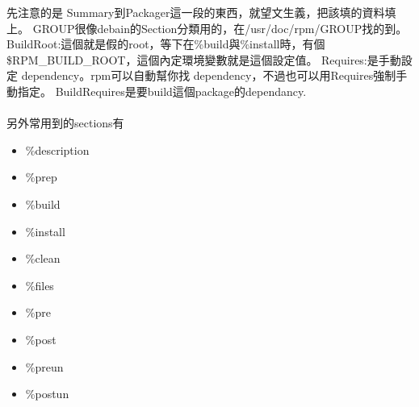 先注意的是 Summary到Packager這一段的東西，就望文生義，把該填的資料填上。
GROUP很像debain的Section分類用的，在/usr/doc/rpm/GROUP找的到。
BuildRoot:這個就是假的root，等下在\%build與\%install時，有個
\$RPM\_BUILD\_ROOT，這個內定環境變數就是這個設定值。 Requires:是手動設定
dependency。rpm可以自動幫你找 dependency，不過也可以用Requires強制手動指定。
BuildRequires是要build這個package的dependancy.
\\\\
另外常用到的sections有
\begin{itemize}
  \item \%description
  \item \%prep
  \item \%build
  \item \%install
  \item \%clean
  \item \%files
  \item \%pre
  \item \%post
  \item \%preun
  \item \%postun
\end{itemize}
    
